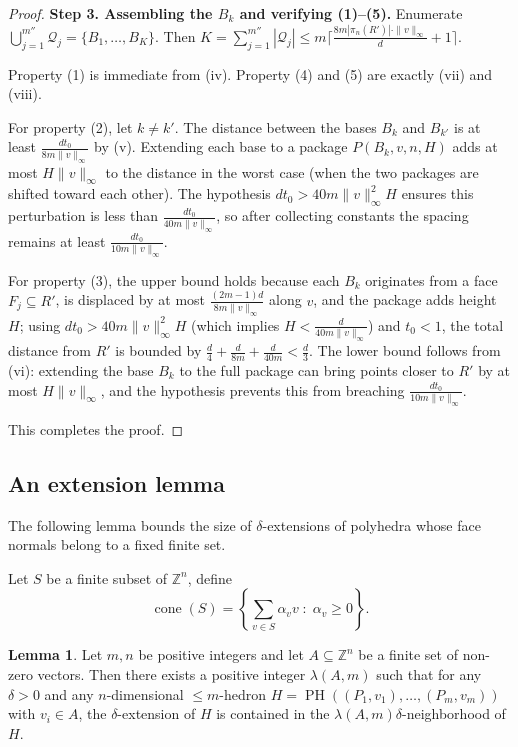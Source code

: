 \documentclass{amsart}
\theoremstyle{definition}
\newtheorem{lemma}[theorem]{Lemma}
\newcommand{\Z}{\mathbb Z}
\begin{document}
\begin{proof}
\medskip\noindent
\textbf{Step 3.  Assembling the $B_k$ and verifying (1)--(5).}
Enumerate $\bigcup_{j=1}^{m''}\mathcal{Q}_j=\{B_1,\dots,B_K\}$.  Then
$K=\sum_{j=1}^{m''}|\mathcal{Q}_j|
\leq m\bigl\lceil\frac{8m|\pi_n(R')|\cdot\|v\|_\infty}{d}+1\bigr\rceil$.

Property (1) is immediate from (iv).  Property (4) and (5) are exactly (vii) and (viii).

For property (2), let $k\neq k'$.  The distance between the bases $B_k$ and
$B_{k'}$ is at least $\frac{d t_0}{8m\|v\|_\infty}$ by (v).  Extending each
base to a package $P(B_k,v,n,H)$ adds at most $H\|v\|_\infty$ to the distance
in the worst case (when the two packages are shifted toward each other).  The
hypothesis $d t_0>40m\|v\|_\infty^2 H$ ensures this perturbation is less than
$\frac{d t_0}{40m\|v\|_\infty}$, so after collecting constants the spacing
remains at least $\frac{d t_0}{10m\|v\|_\infty}$.

For property (3), the upper bound holds because each $B_k$ originates from a
face $F_j\subseteq R'$, is displaced by at most
$\frac{(2m-1)d}{8m\|v\|_\infty}$ along $v$, and the package adds height
$H$; using $d t_0>40m\|v\|_\infty^2 H$ (which implies
$H<\frac{d}{40m\|v\|_\infty}$) and $t_0<1$, the total distance from $R'$ is
bounded by $\frac{d}{4}+\frac{d}{8m}+\frac{d}{40m}<\frac{d}{3}$.  The lower
bound follows from (vi): extending the base $B_k$ to the full package can
bring points closer to $R'$ by at most $H\|v\|_\infty$, and the hypothesis
prevents this from breaching $\frac{d t_0}{10m\|v\|_\infty}$.

This completes the proof.
\end{proof}

\subsection{An extension lemma}

The following lemma bounds the size of $\delta$-extensions of polyhedra
whose face normals belong to a fixed finite set.

Let $S$ be a finite subset of $\Z^n$, define 
$$\operatorname{cone}(S) = \left\{ \sum_{v \in S} \alpha_v v \;:\; \alpha_v \ge 0 \right\}.$$

\begin{lemma}\label{lem:extension}
Let $m, n$ be positive integers and let $A\subseteq\mathbb{Z}^n$ be a
finite set of non-zero vectors. Then there exists a positive integer
$\lambda(A,m)$ such that for any $\delta>0$ and any $n$-dimensional $\leq\!\! m$-hedron
$H=\operatorname{PH}((P_1,v_1),\dots,(P_m,v_m))$ with $v_i\in A$, the
$\delta$-extension of $H$ is contained in the
$\lambda(A,m)\delta$-neighborhood of $H$.
\end{lemma}
\end{document}

